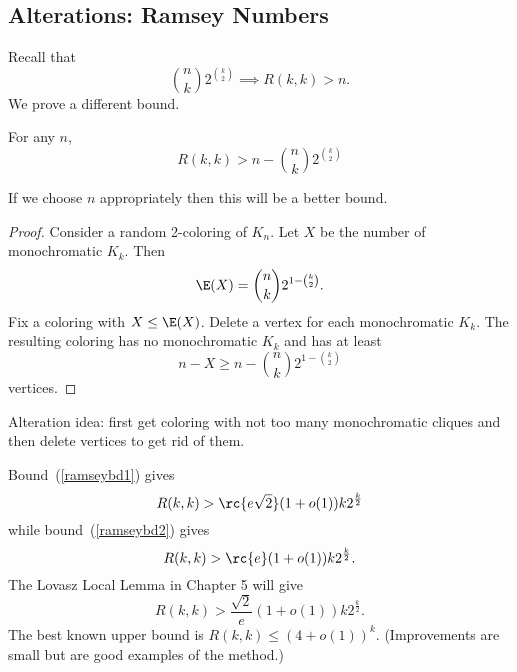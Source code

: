 

\subsection{Alterations: Ramsey Numbers}

Recall that 
\begin{equation}\label{ramseybd1}
\binom nk 2^{\binom k2}\implies R(k,k)>n.
\end{equation}
We prove a different bound.
\begin{thm}
For any $n$,
\begin{equation}\label{ramseybd2}
R(k,k)>n-\binom nk 2^{\binom k2}
\end{equation}
\end{thm}
If we choose $n$ appropriately then this will be a better bound.
\begin{proof}
Consider a random 2-coloring of $K_n$. Let $X$ be the number of monochromatic $K_k$. Then
\[
\E(X)=\binom nk 2^{1-\binom k2}.
\]
Fix a coloring with $X\leq \E(X)$. Delete a vertex for each monochromatic $K_k$. The resulting coloring has no monochromatic $K_k$ and has at least
\[
n-X\geq n-\binom nk 2^{1-\binom k2}
\]
vertices.
\end{proof}
Alteration idea: first get coloring with not too many monochromatic cliques and then delete vertices to get rid of them.

Bound~(\ref{ramseybd1}) gives
\[R(k,k)>\rc{e\sqrt 2}(1+o(1))k2^{\frac k2}\]
while bound~(\ref{ramseybd2}) gives
\[
R(k,k)>\rc{e}(1+o(1))k2^{\frac k2}.
\]
The Lovasz Local Lemma in Chapter 5 will give
\[
R(k,k)>\frac{\sqrt 2}{e}(1+o(1))k2^{\frac k2}.
\]
The best known upper bound is $R(k,k)\leq (4+o(1))^k$. (Improvements are small but are good examples of the method.)

